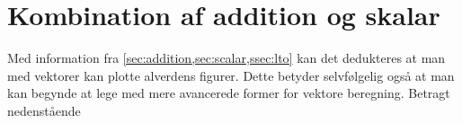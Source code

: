 \section{Kombination af addition og skalar}
Med information fra \cref{sec:addition,sec:scalar,ssec:lto} kan det dedukteres at man med vektorer kan plotte alverdens figurer.
Dette betyder selvfølgelig også at man kan begynde at lege med mere avancerede former for vektore beregning.
Betragt nedenstående 
